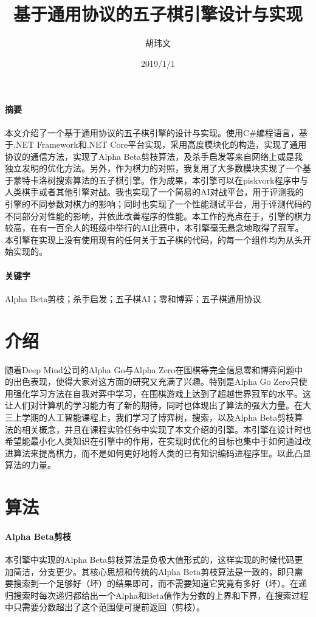 \documentclass{ctexart}
\title{基于通用协议的五子棋引擎设计与实现}
\author{胡玮文}
\date{2019/1/1}
\begin{document}
\maketitle
\newpage

\paragraph{摘要} 本文介绍了一个基于通用协议的五子棋引擎的设计与实现。使用C\#编程语言，基于.NET Framework和.NET Core平台实现，采用高度模块化的构造，实现了通用协议的通信方法，实现了Alpha Beta剪枝算法，及杀手启发等来自网络上或是我独立发明的优化方法。另外，作为棋力的对照，我复用了大多数模块实现了一个基于蒙特卡洛树搜索算法的五子棋引擎。作为成果，本引擎可以在piskvork程序中与人类棋手或者其他引擎对战。我也实现了一个简易的AI对战平台，用于评测我的引擎的不同参数对棋力的影响；同时也实现了一个性能测试平台，用于评测代码的不同部分对性能的影响，并依此改善程序的性能。本工作的亮点在于，引擎的棋力较高，在有一百余人的班级中举行的AI比赛中，本引擎毫无悬念地取得了冠军。本引擎在实现上没有使用现有的任何关于五子棋的代码，的每一个组件均为从头开始实现的。

\paragraph{关键字} Alpha Beta剪枝；杀手启发；五子棋AI；零和博弈；五子棋通用协议

\section{介绍}
随着Deep Mind公司的Alpha Go与Alpha Zero在围棋等完全信息零和博弈问题中的出色表现，使得大家对这方面的研究又充满了兴趣。特别是Alpha Go Zero只使用强化学习方法在自我对弈中学习，在围棋游戏上达到了超越世界冠军的水平。这让人们对计算机的学习能力有了新的期待，同时也体现出了算法的强大力量。在大三上学期的人工智能课程上，我们学习了博弈树，搜索，以及Alpha Beta剪枝算法的相关概念，并且在课程实验任务中实现了本文介绍的引擎。本引擎在设计时也希望能最小化人类知识在引擎中的作用，在实现时优化的目标也集中于如何通过改进算法来提高棋力，而不是如何更好地将人类的已有知识编码进程序里。以此凸显算法的力量。

\section{算法}

\paragraph{Alpha Beta剪枝} 本引擎中实现的Alpha Beta剪枝算法是负极大值形式的，这样实现的时候代码更加简洁，分支更少。其核心思想和传统的Alpha Beta剪枝算法是一致的，即只需要搜索到一个足够好（坏）的结果即可，而不需要知道它究竟有多好（坏）。在递归搜索时每次递归都给出一个Alpha和Beta值作为分数的上界和下界，在搜索过程中只需要分数超出了这个范围便可提前返回（剪枝）。
\end{document}
